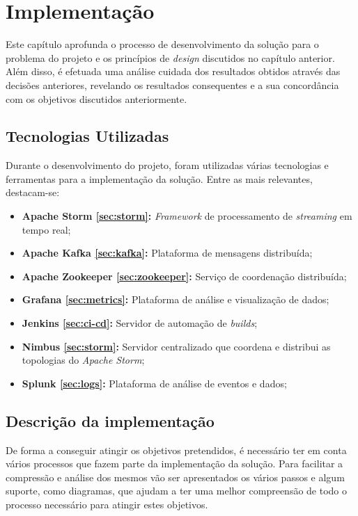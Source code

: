 \chapter{Implementação}
\label{sec:5-Implementacao}

Este capítulo aprofunda o processo de desenvolvimento da solução para o problema do projeto e os 
princípios de \textit{design} discutidos no capítulo anterior. Além disso, é efetuada uma análise 
cuidada dos resultados obtidos através das decisões anteriores, revelando os resultados
consequentes e a sua concordância com os objetivos discutidos anteriormente.

\section{Tecnologias Utilizadas}

Durante o desenvolvimento do projeto, foram utilizadas várias tecnologias e ferramentas para a 
implementação da solução. Entre as mais relevantes, destacam-se:

\begin{itemize}
  \item \textbf{Apache Storm \cite{storm} \ref{sec:storm}:} \textit{Framework} de processamento de 
    \textit{streaming} em tempo real;
  \item \textbf{Apache Kafka \cite{kafka} \ref{sec:kafka}:} Plataforma de mensagens distribuída;
  \item \textbf{Apache Zookeeper \cite{zookeeper} \ref{sec:zookeeper}:} Serviço de coordenação distribuída;
  \item \textbf{Grafana \cite{grafana} \ref{sec:metrics}:} Plataforma de análise e visualização de dados;
  \item \textbf{Jenkins \cite{jenkins} \ref{sec:ci-cd}:} Servidor de automação de \textit{builds}; 
  \item \textbf{Nimbus \cite{nimbus} \ref{sec:storm}:} Servidor centralizado que coordena e distribui as topologias 
    do \textit{Apache Storm};
  \item \textbf{Splunk \cite{splunk} \ref{sec:logs}:} Plataforma de análise de eventos e dados;
\end{itemize}

\section{Descrição da implementação}

De forma a conseguir atingir os objetivos pretendidos, é necessário ter em conta vários processos
que fazem parte da implementação da solução. Para facilitar a compressão e análise dos mesmos vão 
ser apresentados os vários passos e algum suporte, como diagramas, que ajudam a ter uma melhor 
compreensão de todo o processo necessário para atingir estes objetivos.

